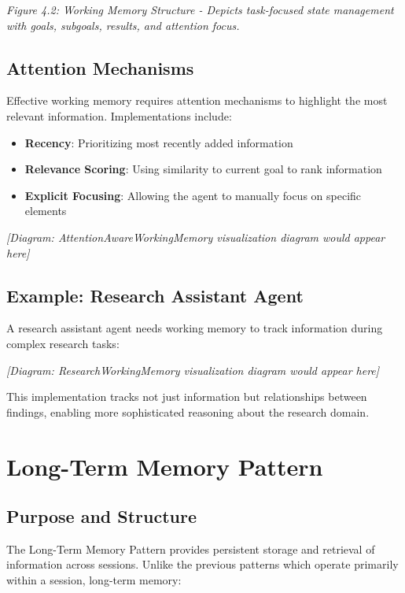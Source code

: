 \documentclass[11pt,oneside]{book}
\providecommand{\tightlist}{%
  \setlength{\itemsep}{0pt}\setlength{\parskip}{0pt}}
\begin{document}
\emph{Figure 4.2: Working Memory Structure - Depicts task-focused state
management with goals, subgoals, results, and attention focus.}

\subsection{Attention Mechanisms}\label{attention-mechanisms}

Effective working memory requires attention mechanisms to highlight the
most relevant information. Implementations include:

\begin{itemize}
\tightlist
\item
  \textbf{Recency}: Prioritizing most recently added information
\item
  \textbf{Relevance Scoring}: Using similarity to current goal to rank
  information
\item
  \textbf{Explicit Focusing}: Allowing the agent to manually focus on
  specific elements
\end{itemize}

\emph{{[}Diagram: AttentionAwareWorkingMemory visualization diagram
would appear here{]}}

\subsection{Example: Research Assistant
Agent}\label{example-research-assistant-agent}

A research assistant agent needs working memory to track information
during complex research tasks:

\emph{{[}Diagram: ResearchWorkingMemory visualization diagram would
appear here{]}}

This implementation tracks not just information but relationships
between findings, enabling more sophisticated reasoning about the
research domain.

\section{Long-Term Memory Pattern}\label{long-term-memory-pattern}

\subsection{Purpose and Structure}\label{purpose-and-structure-1}

The Long-Term Memory Pattern provides persistent storage and retrieval
of information across sessions. Unlike the previous patterns which
operate primarily within a session, long-term memory:
\end{document}
